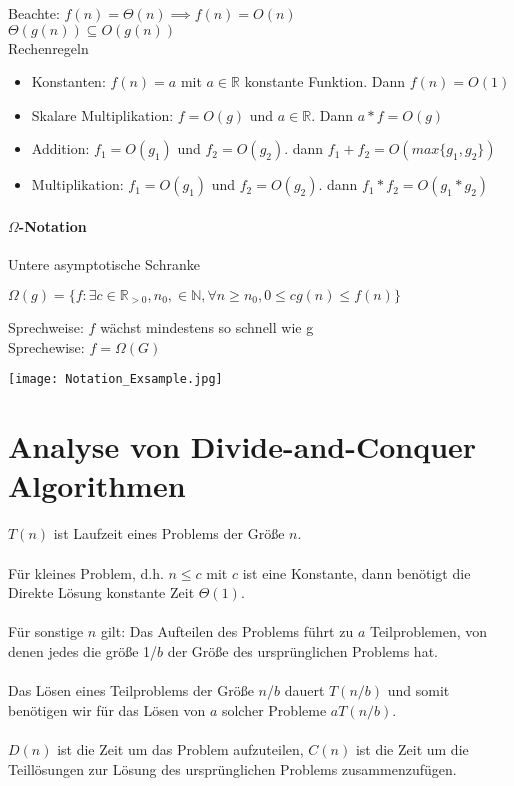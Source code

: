 	\noindent Beachte: $f(n) = \Theta (n) \implies f(n) = O(n)$ \\
	\indent \hspace{1.5cm} $\Theta (g(n)) \subseteq O(g(n))$ \\

	\noindent Rechenregeln
	\begin{itemize}
		\item Konstanten: $f(n) = a$ mit $a \in \mathbb{R}$ konstante Funktion. Dann $f(n) = O(1)$
		\item Skalare Multiplikation: $f = O(g)$ und $a \in \mathbb{R}$. Dann $a*f = O(g)$
		\item Addition: $f_1 = O(g_1)$ und $f_2 = O(g_2)$. dann $f_1 + f_2 = O(max\{ g_1, g_2\})$
		\item Multiplikation: $f_1 = O(g_1)$ und $f_2 = O(g_2)$. dann $f_1 * f_2 = O(g_1 * g_2)$
	\end{itemize}

	\paragraph{$\Omega$-Notation}
	Untere asymptotische Schranke
	\begin{center}
		$\Omega(g) = \{f: \exists c \in \mathbb{R}_{>0}, n_0 , \in \mathbb{N}, \forall n \geq n_0 , 0 \leq c g(n) \leq f(n)\}$
	\end{center}
	Sprechweise: $f$ wächst mindestens so schnell wie g \\
	Sprechewise: $f = \Omega(G)$ \\

	\begin{center}
		\texttt{[image: Notation\_Exsample.jpg]}
	\end{center}



\vspace{1.5cm}
\section{Analyse von Divide-and-Conquer Algorithmen} %

	$T(n)$ ist Laufzeit eines Problems der Grö\ss e $n$. \\ \\
	\noindent Für kleines Problem, d.h. $n \leq c$ mit $c$ ist eine Konstante, dann benötigt 
	die Direkte Lösung konstante Zeit $\Theta (1)$. \\ \\
	\noindent Für sonstige $n$ gilt: Das Aufteilen des Problems führt zu $a$ Teilproblemen, 
	von denen jedes die grö\ss e 1/$b$ der Grö\ss e des ursprünglichen Problems hat. \\ \\
	\noindent Das Lösen eines Teilproblems der Grö\ss e $n$/$b$ dauert $T(n/b)$ und somit 
	benötigen wir für das Lösen von $a$ solcher Probleme $aT(n/b)$. \\ \\
	\noindent $D(n)$ ist die Zeit um das Problem aufzuteilen, $C(n)$ ist die Zeit um die 
	Teillösungen zur Lösung des ursprünglichen Problems zusammenzufügen. \\

